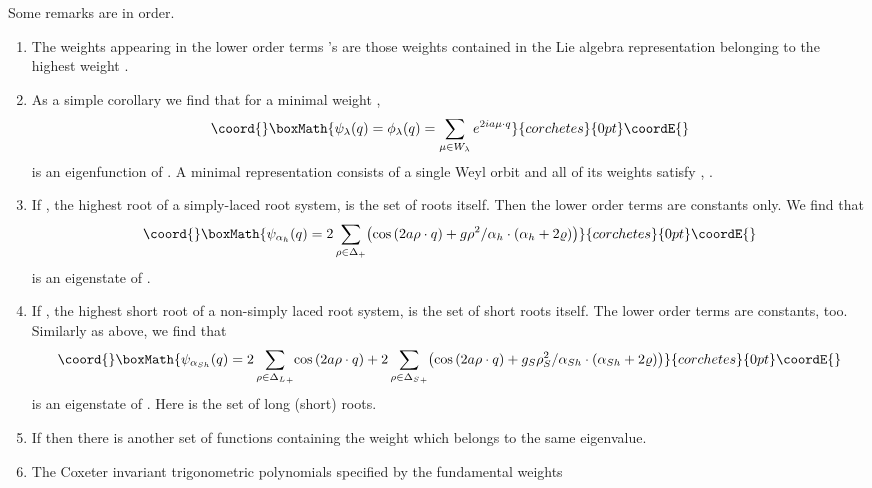 \documentclass[a4paper,12pt]{article}
\begin{document}
\bigskip
Some remarks are in order.
\begin{enumerate}
\item  The weights \myHighlight{\(\mu\)}\coordHE{} appearing in the lower order terms
\myHighlight{\(\{\phi_{\lambda^\prime}\}\)}\coordHE{}'s are those weights contained in the
Lie algebra representation belonging to the highest weight
\myHighlight{\(\lambda\)}\coordHE{}.
\item
As a simple corollary we find that for a minimal weight
\myHighlight{\(\lambda\)}\coordHE{},
\[\coord{}\boxMath{
   \psi_{\lambda}(q)=\phi_{\lambda}(q)=\sum_{\mu\in
   W_{\lambda}}e^{2ia\mu\cdot q}
}{corchetes}{0pt}\coordE{}\]
 is an eigenfunction of \coordHE{}.
A minimal representation \cite{bcs1} consists of a single Weyl orbit
and all of
its weights \myHighlight{\(\mu\)}\coordHE{} satisfy \coordHE{}, \myHighlight{\(\forall
\rho\in\Delta\)}\coordHE{}.
\item
If \coordHE{}, the highest root of a simply-laced root
system, \coordHE{} is the set of roots itself. Then the lower
order terms are constants only. We find that
\[\coord{}\boxMath{
  \psi_{\alpha_h}(q)= 2\sum_{\rho\in\Delta_+}\!
   \left(\cos{(2a\rho\cdot
   q)}+g\rho^2/\alpha_h\cdot(\alpha_h+2\varrho)\right)
}{corchetes}{0pt}\coordE{}\]
is an eigenstate of \coordHE{}.
\item
If \coordHE{}, the highest short root of a non-simply
laced root system, \coordHE{} is the set of short roots itself.
The lower
order terms are constants, too.
Similarly as above, we find that
\[\coord{}\boxMath{
  \psi_{\alpha_{Sh}}(q)= 2\sum_{\rho\in{\Delta_L}_+}\!
   \cos{(2a\rho\cdot q)}+2\sum_{\rho\in{\Delta_S}_+}\!
   \left(\cos{(2a\rho\cdot
   q)}+g_S\rho_S^2/\alpha_{Sh}\cdot(\alpha_{Sh}+2\varrho)\right)
}{corchetes}{0pt}\coordE{}\]
is an eigenstate of \coordHE{}. Here \coordHE{} is the
set of long (short) roots.
\item
If \coordHE{} then
there is   another set of functions containing the weight
\myHighlight{\(-\lambda\)}\coordHE{} which belongs to  the same eigenvalue.
\item
The  Coxeter invariant trigonometric polynomials specified by
the fundamental weights \coordHE{}

\end{enumerate}
\end{document}
